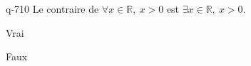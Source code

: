 \begin{truefalse}{q-710}
Le contraire de $\forall x \in \mathbb R,\: x>0$ est $\exists x \in \mathbb R,\: x> 0$.
\item Vrai
\item* Faux
\end{truefalse}

